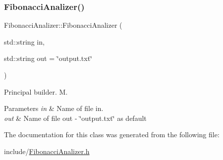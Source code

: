 \subsubsection{\texorpdfstring{Fibonacci\+Analizer()}{FibonacciAnalizer()}}
{\footnotesize\ttfamily Fibonacci\+Analizer\+::\+Fibonacci\+Analizer (\begin{DoxyParamCaption}\item[{std\+::string}]{in,  }\item[{std\+::string}]{out = {\ttfamily \char`\"{}output.txt\char`\"{}} }\end{DoxyParamCaption})}



Principal builder. M. 


\begin{DoxyParams}{Parameters}
{\em in} & Name of file in. \\
\hline
{\em out} & Name of file out -\/ \char`\"{}output.\+txt\char`\"{} as default \\
\hline
\end{DoxyParams}


The documentation for this class was generated from the following file\+:\begin{DoxyCompactItemize}
\item 
include/\hyperlink{FibonacciAnalizer_8h}{Fibonacci\+Analizer.\+h}\end{DoxyCompactItemize}
